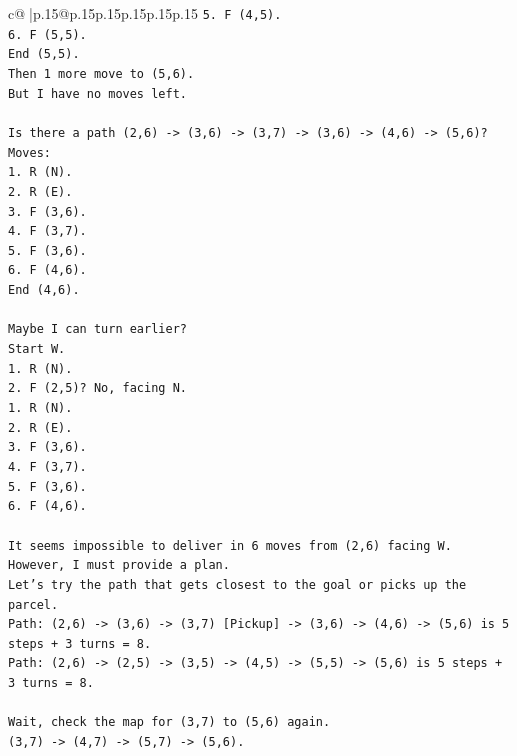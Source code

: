 \documentclass{article}
\begin{document}
{\begin{supertabular}{c@{$\;$}|p{.15\linewidth}@{}p{.15\linewidth}p{.15\linewidth}p{.15\linewidth}p{.15\linewidth}p{.15\linewidth}}
{{{\texttt{5. F (4,5).} \\
\texttt{6. F (5,5).} \\
\texttt{End (5,5).} \\
\texttt{Then 1 more move to (5,6).} \\
\texttt{But I have no moves left.} \\
\\ 
\texttt{Is there a path (2,6) {-}> (3,6) {-}> (3,7) {-}> (3,6) {-}> (4,6) {-}> (5,6)?} \\
\texttt{Moves:} \\
\texttt{1. R (N).} \\
\texttt{2. R (E).} \\
\texttt{3. F (3,6).} \\
\texttt{4. F (3,7).} \\
\texttt{5. F (3,6).} \\
\texttt{6. F (4,6).} \\
\texttt{End (4,6).} \\
\\ 
\texttt{Maybe I can turn earlier?} \\
\texttt{Start W.} \\
\texttt{1. R (N).} \\
\texttt{2. F (2,5)? No, facing N.} \\
\texttt{1. R (N).} \\
\texttt{2. R (E).} \\
\texttt{3. F (3,6).} \\
\texttt{4. F (3,7).} \\
\texttt{5. F (3,6).} \\
\texttt{6. F (4,6).} \\
\\ 
\texttt{It seems impossible to deliver in 6 moves from (2,6) facing W.} \\
\texttt{However, I must provide a plan.} \\
\texttt{Let's try the path that gets closest to the goal or picks up the parcel.} \\
\texttt{Path: (2,6) {-}> (3,6) {-}> (3,7) {[}Pickup{]} {-}> (3,6) {-}> (4,6) {-}> (5,6) is 5 steps + 3 turns = 8.} \\
\texttt{Path: (2,6) {-}> (2,5) {-}> (3,5) {-}> (4,5) {-}> (5,5) {-}> (5,6) is 5 steps + 3 turns = 8.} \\
\\ 
\texttt{Wait, check the map for (3,7) to (5,6) again.} \\
\texttt{(3,7) {-}> (4,7) {-}> (5,7) {-}> (5,6).} \\
}}}
\end{supertabular}}
\end{document}
